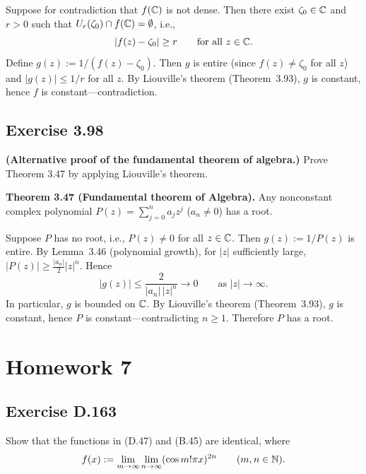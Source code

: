 \documentclass{article}
\begin{document}
\begin{solution}
  Suppose for contradiction that $f(\mathbb{C})$ is not dense.
  Then there exist $\zeta_0 \in \mathbb{C}$ and $r > 0$ such that
  $U_r(\zeta_0) \cap f(\mathbb{C}) = \emptyset$, i.e.,
  \[
    |f(z) - \zeta_0| \ge r
    \qquad\text{for all } z \in \mathbb{C}.
  \]
  Define $g(z) := 1/(f(z) - \zeta_0)$.
  Then $g$ is entire (since $f(z) \ne \zeta_0$ for all $z$) and
  $|g(z)| \le 1/r$ for all $z$.
  By Liouville's theorem (Theorem~3.93), $g$ is constant,
  hence $f$ is constant---contradiction.\qedhere
\end{solution}

\subsection{Exercise 3.98}

\textbf{(Alternative proof of the fundamental theorem of algebra.)}
Prove Theorem 3.47 by applying Liouville's theorem.

\textbf{Theorem 3.47 (Fundamental theorem of Algebra).}
Any nonconstant complex polynomial
$P(z) = \sum_{j=0}^{n} a_j z^j$ ($a_n \ne 0$) has a root.

\begin{solution}
  Suppose $P$ has no root, i.e., $P(z) \ne 0$ for all $z \in \mathbb{C}$.
  Then $g(z) := 1/P(z)$ is entire.
  By Lemma~3.46 (polynomial growth), for $|z|$ sufficiently
  large, $|P(z)| \ge \frac{|a_n|}{2}|z|^n$.
  Hence
  \[
    |g(z)| \le \frac{2}{|a_n|\,|z|^n} \to 0
    \qquad\text{as } |z| \to \infty.
  \]
  In particular, $g$ is bounded on $\mathbb{C}$.
  By Liouville's theorem (Theorem~3.93), $g$ is constant,
  hence $P$ is constant---contradicting $n \ge 1$.
  Therefore $P$ has a root.\qedhere
\end{solution}

\section{Homework 7}

\subsection{Exercise D.163}

Show that the functions in (D.47) and (B.45) are identical,
where
\[
  f(x) := \lim_{m \to \infty} \lim_{n \to \infty} (\cos m!\pi x)^{2n}
  \qquad (m, n \in \mathbb{N}).
\]
\end{document}
